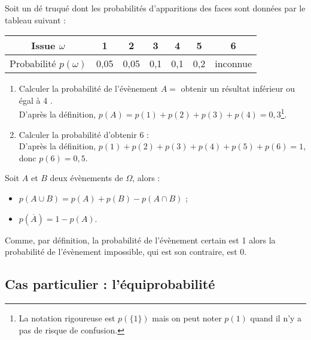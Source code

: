 \begin{exemple*}\label{detruque}
Soit un d\'e truqu\'e dont les probabilit\'es d'apparitions des faces sont donn\'ees par le tableau suivant :
\begin{center}
\begin{tabular}{|*{7}{c|}}\hline
Issue $\omega$ & 1& 2 &3 &4 &5 &6 \\ \hline
Probabilit\'e $p(\omega)$& 0,05& 0,05& 0,1& 0,1& 0,2& inconnue\\ \hline
\end{tabular}
\end{center}

\begin{enumerate}
	\item Calculer la probabilit\'e de l'\'ev\`enement $A =$ \og obtenir un r\'esultat inf\'erieur ou \'egal \`a 4 \fg.\\
D'apr\`es la d\'efinition, $p(A) = p(1) + p(2) + p(3) + p(4) = 0,3$\footnote{La notation rigoureuse est $p(\{1\})$ mais on peut noter $p(1)$ quand il n'y a pas de risque de confusion.}.

\item Calculer la probabilit\'e d'obtenir 6 :\\
D'apr\`es la d\'efinition, $p(1) + p(2) + p(3) + p(4) + p(5) + p(6) = 1$, donc $p(6) = 0,5$.
\end{enumerate}
\end{exemple*}

\begin{prop}
Soit $A$ et $B$ deux \'ev\`enements de $\Omega$, alors :
\vspace{-1em}\begin{multicols}{2}\begin{itemize}
	\item $p ( A \cup B ) = p ( A ) + p ( B ) - p ( A \cap B )$ ;
	\item $p (\overline{A}) = 1 - p ( A )$.
\end{itemize}\end{multicols}\vspace{-1em}
\end{prop}

\begin{rmq} Comme, par d\'efinition, la probabilit\'e de l'\'ev\`enement certain est 1 alors la probabilit\'e de l'\'ev\`enement impossible, qui est son contraire, est 0. \end{rmq}



\subsection{Cas particulier : l'\'equiprobabilit\'e}

